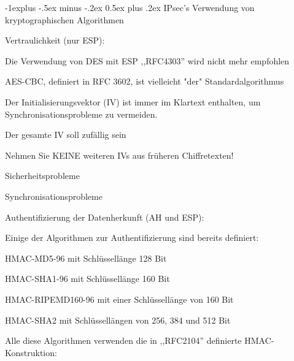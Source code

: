 \documentclass[a4paper]{article}
\makeatletter
\renewcommand{\subsection}{\@startsection{subsection}{2}{0mm}%
 {-1explus -.5ex minus -.2ex}%
 {0.5ex plus .2ex}%
 {\normalfont\normalsize\bfseries}}
\makeatother
\begin{document}
\begin{multicols}{3}
      \subsection{IPsec's Verwendung von kryptographischen Algorithmen}
      \begin{itemize*}
            \item Vertraulichkeit (nur ESP):
            \begin{itemize*}
                  \item Die Verwendung von DES mit ESP ,,RFC4303'' wird nicht mehr empfohlen
                  \item AES-CBC, definiert in RFC 3602, ist vielleicht "der" Standardalgorithmus
                  \item Der Initialisierungsvektor (IV) ist immer im Klartext enthalten, um Synchronisationsprobleme zu vermeiden.
                  \item Der gesamte IV soll zufällig sein
                  \item Nehmen Sie KEINE weiteren IVs aus früheren Chiffretexten!
                  \begin{itemize*}
                        \item Sicherheitsprobleme
                        \item Synchronisationsprobleme
                  \end{itemize*}
            \end{itemize*}
            \item Authentifizierung der Datenherkunft (AH und ESP):
            \begin{itemize*}
                  \item Einige der Algorithmen zur Authentifizierung sind bereits definiert:
                  \begin{itemize*}
                        \item HMAC-MD5-96 mit Schlüssellänge 128 Bit
                        \item HMAC-SHA1-96 mit Schlüssellänge 160 Bit
                        \item HMAC-RIPEMD160-96 mit einer Schlüssellänge von 160 Bit
                        \item HMAC-SHA2 mit Schlüssellängen von 256, 384 und 512 Bit
                  \end{itemize*}
                  \item Alle diese Algorithmen verwenden die in ,,RFC2104'' definierte HMAC-Konstruktion:

\end{itemize*}
\end{itemize*}
\end{multicols}
\end{document}
